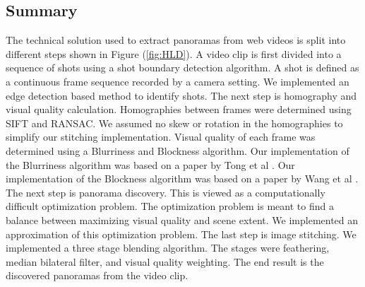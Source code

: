 \subsection{Summary} \label{sec:TechSolSummary}

The technical solution used to extract panoramas from web videos is split into different steps shown in Figure (\ref{fig:HLD}).  
A video clip is first divided into a sequence of shots using a shot boundary detection algorithm.  
A shot is defined as a continuous frame sequence recorded by a camera setting.  We implemented an edge detection based method to identify shots.  
The next step is homography and visual quality calculation.  Homographies between frames were determined using SIFT and RANSAC.  
We assumed no skew or rotation in the homographies to simplify our stitching implementation.  
Visual quality of each frame was determined using a Blurriness and Blockness algorithm.  
Our implementation of the Blurriness algorithm was based on a paper by Tong et al \cite{Tong}.  
Our implementation of the Blockness algorithm was based on a paper by Wang et al \cite{Wang}.  The next step is panorama discovery.  
This is viewed as a computationally difficult optimization problem.  
The optimization problem is meant to find a balance between maximizing visual quality and scene extent.  
We implemented an approximation of this optimization problem.  The last step is image stitching.  We implemented a three stage blending algorithm.  
The stages were feathering, median bilateral filter, and visual quality weighting.  The end result is the discovered panoramas from the video clip.

